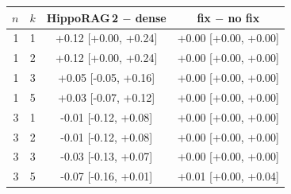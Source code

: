 \begin{tabular}{rr cc}
\toprule
$n$ & $k$ & HippoRAG\,2 $-$ dense & fix $-$ no fix \\
\midrule
1 & 1 & +0.12 [+0.00, +0.24] & +0.00 [+0.00, +0.00] \\
1 & 2 & +0.12 [+0.00, +0.24] & +0.00 [+0.00, +0.00] \\
1 & 3 & +0.05 [-0.05, +0.16] & +0.00 [+0.00, +0.00] \\
1 & 5 & +0.03 [-0.07, +0.12] & +0.00 [+0.00, +0.00] \\
3 & 1 & -0.01 [-0.12, +0.08] & +0.00 [+0.00, +0.00] \\
3 & 2 & -0.01 [-0.12, +0.08] & +0.00 [+0.00, +0.00] \\
3 & 3 & -0.03 [-0.13, +0.07] & +0.00 [+0.00, +0.00] \\
3 & 5 & -0.07 [-0.16, +0.01] & +0.01 [+0.00, +0.04] \\
\bottomrule
\end{tabular}

